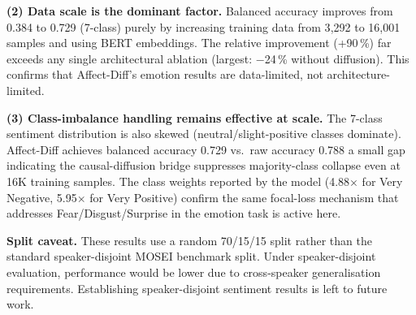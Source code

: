 \documentclass[conference]{IEEEtran}
\begin{document}
\textbf{(2) Data scale is the dominant factor.}
Balanced accuracy improves from 0.384 to 0.729 (7-class) purely by
increasing training data from 3{,}292 to 16{,}001 samples and using
BERT embeddings.  The relative improvement (+90\,\%) far exceeds any
single architectural ablation (largest: $-$24\,\% without diffusion).
This confirms that Affect-Diff's emotion results are data-limited, not
architecture-limited.

\textbf{(3) Class-imbalance handling remains effective at scale.}
The 7-class sentiment distribution is also skewed (neutral/slight-positive
classes dominate).  Affect-Diff achieves balanced accuracy 0.729 vs.\
raw accuracy 0.788   a small gap indicating the causal-diffusion
bridge suppresses majority-class collapse even at 16K training samples.
The class weights reported by the model (4.88$\times$ for Very Negative,
5.95$\times$ for Very Positive) confirm the same focal-loss mechanism
that addresses Fear/Disgust/Surprise in the emotion task is active here.

\textbf{Split caveat.}
These results use a random 70/15/15 split rather than the standard
speaker-disjoint MOSEI benchmark split.  Under speaker-disjoint
evaluation, performance would be lower due to cross-speaker
generalisation requirements.  Establishing speaker-disjoint sentiment
results is left to future work.
\end{document}
